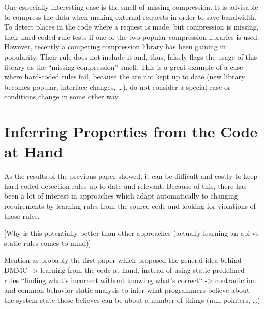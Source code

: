 One especially interesting case is the smell of missing compression.
It is advisable to compress the data when making external requests in order to save bandwidth.
To detect places in the code where a request is made, but compression is missing, their hard-coded rule tests if one of the two popular compression libraries is used.
However, recently a competing compression library has been gaining in popularity.
Their rule does not include it and, thus, falsely flags the usage of this library as the ``missing compression'' smell.
This is a great example of a case where hard-coded rules fail, because the are not kept up to date (new library becomes popular, interface changes, \ldots), do not consider a special case or conditions change in some other way.

\section{Inferring Properties from the Code at Hand}


As the results of the previous paper showed, it can be difficult and costly to keep hard coded detection rules up to date and relevant.
Because of this, there has been a lot of interest in approaches which adapt automatically to changing requirements by learning rules from the source code and looking for violations of those rules.

[Why is this potentially better than other approaches (actually learning an api vs static rules comes to mind)]

Mention \cite{engler2001bugs} as probably the first paper which proposed the general idea behind DMMC -> learning from the code at hand, instead of using static predefined rules
``finding what's incorrect without knowing what's correct`` -> contradiction and common behavior
static analysis to infer what programmers believe about the system state
these believes can be about a number of things (null pointers, \ldots)


